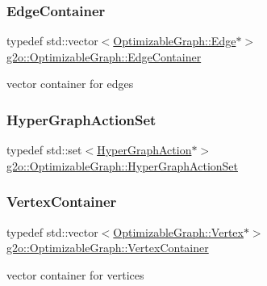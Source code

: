 \subsubsection{\texorpdfstring{Edge\+Container}{EdgeContainer}}
{\footnotesize\ttfamily typedef std\+::vector$<$\mbox{\hyperlink{classg2o_1_1_optimizable_graph_1_1_edge}{Optimizable\+Graph\+::\+Edge}}$\ast$$>$ \mbox{\hyperlink{structg2o_1_1_optimizable_graph_a2b43e807ae6d61ef8749ca1ef7c25f62}{g2o\+::\+Optimizable\+Graph\+::\+Edge\+Container}}}



vector container for edges 

\mbox{\label{structg2o_1_1_optimizable_graph_aa3562ad6794c36ea832095131cfffaac}} 
\subsubsection{\texorpdfstring{Hyper\+Graph\+Action\+Set}{HyperGraphActionSet}}
{\footnotesize\ttfamily typedef std\+::set$<$\mbox{\hyperlink{classg2o_1_1_hyper_graph_action}{Hyper\+Graph\+Action}}$\ast$$>$ \mbox{\hyperlink{structg2o_1_1_optimizable_graph_aa3562ad6794c36ea832095131cfffaac}{g2o\+::\+Optimizable\+Graph\+::\+Hyper\+Graph\+Action\+Set}}}

\mbox{\label{structg2o_1_1_optimizable_graph_a54f01b9b6071e65e6abeebe4afb29dec}} 
\subsubsection{\texorpdfstring{Vertex\+Container}{VertexContainer}}
{\footnotesize\ttfamily typedef std\+::vector$<$\mbox{\hyperlink{classg2o_1_1_optimizable_graph_1_1_vertex}{Optimizable\+Graph\+::\+Vertex}}$\ast$$>$ \mbox{\hyperlink{structg2o_1_1_optimizable_graph_a54f01b9b6071e65e6abeebe4afb29dec}{g2o\+::\+Optimizable\+Graph\+::\+Vertex\+Container}}}



vector container for vertices 



